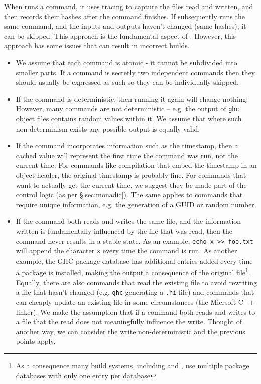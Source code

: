 When \Rattle runs a command, it uses tracing to capture the files read and written, and then records their hashes after the command finishes. If \Rattle subsequently runs the same command, and the inputs and outputs haven't changed (same hashes), it can be skipped. This approach is the fundamental aspect of \Fabricate\citep{fabricate}. However, this approach has some issues that can result in incorrect builds.

\begin{itemize}
\item We assume that each command is atomic - it cannot be subdivided into smaller parts. If a command is secretly two independent commands then they should usually be expressed as such so they can be individually skipped.
\item If the command is deterministic, then running it again will change nothing. However, many commands are not deterministic -- e.g. the output of \texttt{ghc} object files contains random values within it. We assume that where such non-determinism exists any possible output is equally valid.
\item If the command incorporates information such as the timestamp, then a cached value will represent the first time the command was run, not the current time. For commands like compilation that embed the timestamp in an object header, the original timestamp is probably fine. For commands that want to actually get the current time, we suggest they be made part of the control logic (as per \S\ref{sec:monadic}). The same applies to commands that require unique information, e.g. the generation of a GUID or random number.
\item If the command both reads and writes the same file, and the information written is fundamentally influenced by the file that was read, then the command never results in a stable state. As an example, \verb"echo x >> foo.txt" will append the character \texttt{x} every time the command is run. As another example, the GHC package database has additional entries added every time a package is installed, making the output a consequence of the original file\footnote{As a consequence many build systems, including \Bazel and \Rattle, use multiple package databases with only one entry per database}. Equally, there are also commands that read the existing file to avoid rewriting a file that hasn't changed (e.g. \texttt{ghc} generating a \texttt{.hi} file) and commands that can cheaply update an existing file in some circumstances (the Micrsoft C++ linker). We make the assumption that if a command both reads and writes to a file that the read does not meaningfully influence the write. Thought of another way, we can consider the write non-deterministic and the previous points apply.

\end{itemize}
